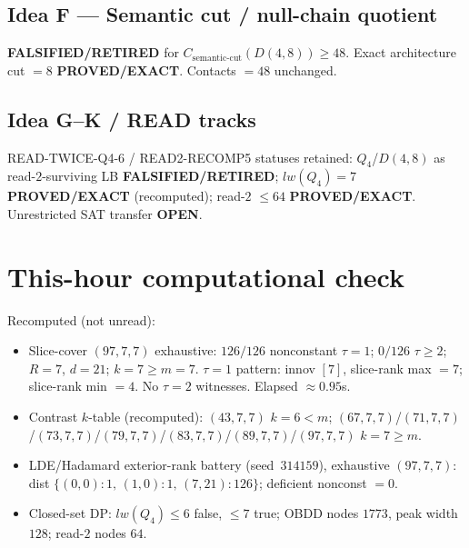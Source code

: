 \documentclass[11pt]{article}
\begin{document}
\subsection*{Idea F --- Semantic cut / null-chain quotient}
\textbf{FALSIFIED/RETIRED} for $C_{\mathrm{semantic\textrm{-}cut}}(D(4,8))\ge48$.
Exact architecture cut $=8$ \textbf{PROVED/EXACT}. Contacts $=48$ unchanged.

\subsection*{Idea G--K / READ tracks}
READ-TWICE-Q4-6 / READ2-RECOMP5 statuses retained: $Q_4$/$D(4,8)$ as read-$2$-surviving LB
\textbf{FALSIFIED/RETIRED}; $lw(Q_4)=7$ \textbf{PROVED/EXACT} (recomputed); read-$2$ $\le64$
\textbf{PROVED/EXACT}. Unrestricted SAT transfer \textbf{OPEN}.

\section*{This-hour computational check}
Recomputed (not unread):
\begin{itemize}
\item Slice-cover $(97,7,7)$ exhaustive: $126/126$ nonconstant $\tau{=}1$;
  $0/126$ $\tau{\ge}2$; $R{=}7$, $d{=}21$; $k{=}7{\ge}m{=}7$.
  $\tau{=}1$ pattern: innov $[7]$, slice-rank max $=7$; slice-rank min $=4$.
  No $\tau{=}2$ witnesses. Elapsed $\approx0.95$s.
\item Contrast $k$-table (recomputed): $(43,7,7)$ $k{=}6{<}m$;
  $(67,7,7)$/$(71,7,7)$/$(73,7,7)$/$(79,7,7)$/$(83,7,7)$/$(89,7,7)$/$(97,7,7)$ $k{=}7{\ge}m$.
\item LDE/Hadamard exterior-rank battery (seed~$314159$), exhaustive $(97,7,7)$:
  dist $\{(0,0){:}1,\,(1,0){:}1,\,(7,21){:}126\}$; deficient nonconst $=0$.
\item Closed-set DP: $lw(Q_4)\le6$ false, $\le7$ true; OBDD nodes $1773$, peak width $128$;
  read-$2$ nodes $64$.
\end{itemize}
\end{document}
